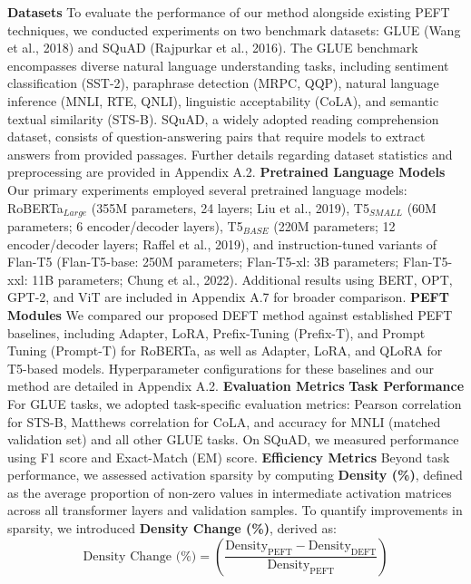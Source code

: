 \documentclass[11pt,a4paper]{article}
\begin{document}
\textbf{Datasets} To evaluate the performance of our method alongside existing PEFT techniques, we conducted experiments on two benchmark datasets: GLUE (Wang et al., 2018) and SQuAD (Rajpurkar et al., 2016). The GLUE benchmark encompasses diverse natural language understanding tasks, including sentiment classification (SST-2), paraphrase detection (MRPC, QQP), natural language inference (MNLI, RTE, QNLI), linguistic acceptability (CoLA), and semantic textual similarity (STS-B). SQuAD, a widely adopted reading comprehension dataset, consists of question-answering pairs that require models to extract answers from provided passages. Further details regarding dataset statistics and preprocessing are provided in Appendix A.2. \textbf{Pretrained Language Models} Our primary experiments employed several pretrained language models: RoBERTa\(_{Large}\) (355M parameters, 24 layers; Liu et al., 2019), T5\(_{SMALL}\) (60M parameters; 6 encoder/decoder layers), T5\(_{BASE}\) (220M parameters; 12 encoder/decoder layers; Raffel et al., 2019), and instruction-tuned variants of Flan-T5 (Flan-T5-base: 250M parameters; Flan-T5-xl: 3B parameters; Flan-T5-xxl: 11B parameters; Chung et al., 2022). Additional results using BERT, OPT, GPT-2, and ViT are included in Appendix A.7 for broader comparison. \textbf{PEFT Modules} We compared our proposed DEFT method against established PEFT baselines, including Adapter, LoRA, Prefix-Tuning (Prefix-T), and Prompt Tuning (Prompt-T) for RoBERTa, as well as Adapter, LoRA, and QLoRA for T5-based models. Hyperparameter configurations for these baselines and our method are detailed in Appendix A.2. \textbf{Evaluation Metrics} \textbf{Task Performance} For GLUE tasks, we adopted task-specific evaluation metrics: Pearson correlation for STS-B, Matthews correlation for CoLA, and accuracy for MNLI (matched validation set) and all other GLUE tasks. On SQuAD, we measured performance using F1 score and Exact-Match (EM) score. \textbf{Efficiency Metrics} Beyond task performance, we assessed activation sparsity by computing \textbf{Density (\%)}, defined as the average proportion of non-zero values in intermediate activation matrices across all transformer layers and validation samples. To quantify improvements in sparsity, we introduced \textbf{Density Change (\%)}, derived as:
\[\text{Density Change (\%)} = \left( \frac{\text{Density}_{\text{PEFT}} - \text{Density}_{\text{DEFT}}}{\text{Density}_{\text{PEFT}}} \right)\]
\end{document}
